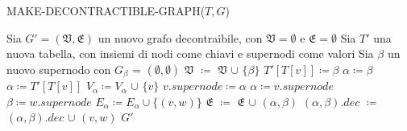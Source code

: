 \begin{algorithm}[H]
    \caption{MAKE-DECONTRACTIBLE-GRAPH($T,G$)}\label{alg:make-decontractible-graph}
    \begin{algorithmic}[1]
        \State Sia $G' = (\mathfrak{V}, \mathfrak{E})$ un nuovo grafo decontraibile, con $\mathfrak{V} = \emptyset$
                e $\mathfrak{E} = \emptyset$
        \State Sia $T\mathcal{'}$ una nuova tabella, con insiemi di nodi come chiavi e supernodi come valori
                \State Sia $\beta$ un nuovo supernodo con $G_{\beta}$ = $(\emptyset, \emptyset)$
                \State $\mathfrak{V}$ $\coloneqq$ $\mathfrak{V}$ $\cup$ $\{\beta\}$
                \State $T'[T[v]] \coloneqq \beta$
                \State $\alpha \coloneqq \beta$
            \Else
                \State $\alpha \coloneqq T'[T[v]]$
            \EndIf
            \State $V_{\alpha} \coloneqq V_{\alpha}$ $\cup$ $\{v\}$
            \State $v.supernode \coloneqq \alpha$
        \EndFor
            \State $\alpha \coloneqq v.supernode$
            \State $\beta \coloneqq w.supernode$
            \If {$(\alpha == \beta )$}
                \State $E_{\alpha} \coloneqq E_{\alpha} \cup \{(v,w)\}$
            \Else
                    \State $\mathfrak{E}$ $\coloneqq$ $\mathfrak{E}$ $\cup$ $(\alpha , \beta)$
                \EndIf
                \State $(\alpha , \beta).dec$ $\coloneqq$ $(\alpha , \beta).dec$ $\cup$ $(v, w)$
            \EndIf
        \EndFor
        \State \Return $G'$
    \end{algorithmic}
\end{algorithm}